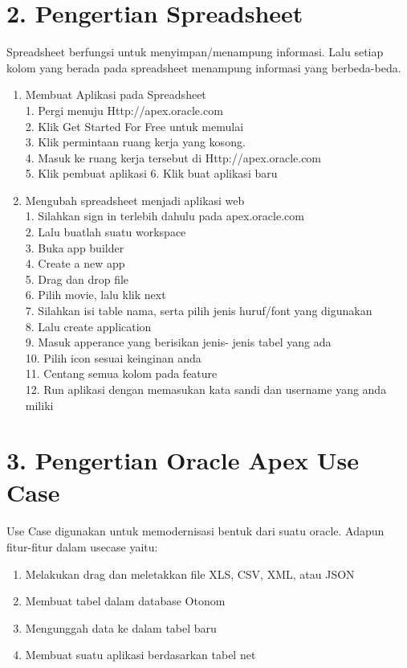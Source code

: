 \section*{\normalsize 2. Pengertian Spreadsheet}
\hspace{\parindent}Spreadsheet berfungsi untuk menyimpan/menampung informasi. Lalu setiap kolom yang berada pada spreadsheet menampung informasi yang berbeda-beda.
\begin{enumerate}[label=\alph*.]
\item Membuat Aplikasi pada Spreadsheet\\
	1. Pergi menuju Http://apex.oracle.com\\
	2. Klik Get Started For Free untuk memulai\\
	3. Klik permintaan ruang kerja yang kosong.\\
	4. Masuk ke ruang kerja tersebut di Http://apex.oracle.com\\
	5. Klik pembuat aplikasi 
	6. Klik buat aplikasi baru\\

\item Mengubah spreadsheet menjadi aplikasi web\\
	1. Silahkan sign in terlebih dahulu pada apex.oracle.com\\
	2. Lalu buatlah suatu workspace\\
	3. Buka app builder\\ 
	4. Create a new app\\ 
	5. Drag dan drop ﬁle\\
	6. Pilih movie, lalu klik next\\
	7. Silahkan isi table nama, serta pilih jenis huruf/font yang digunakan\\
	8. Lalu create application\\
	9. Masuk apperance yang  berisikan jenis- jenis tabel yang ada\\
	10. Pilih icon sesuai keinginan anda \\ 
	11. Centang semua kolom pada feature\\
	12. Run aplikasi dengan memasukan kata sandi dan username yang anda miliki\\
\end{enumerate}

\section*{\normalsize 3. Pengertian Oracle Apex Use Case}
\paragraph{} Use Case digunakan untuk memodernisasi bentuk dari suatu oracle. Adapun fitur-fitur dalam usecase yaitu:
\begin{enumerate}
    \item Melakukan drag dan meletakkan file XLS, CSV, XML, atau JSON
    \item Membuat tabel dalam database Otonom
    \item Mengunggah data ke dalam tabel baru
    \item Membuat suatu aplikasi berdasarkan tabel net
\end{enumerate}
